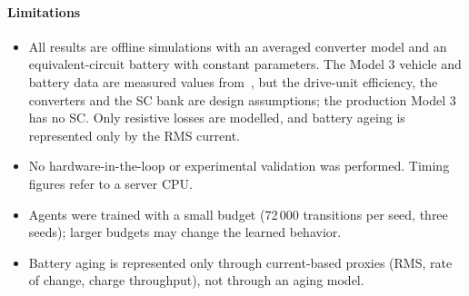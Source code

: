\paragraph{Limitations}
\begin{itemize}
\item All results are offline simulations with an averaged converter model and an equivalent-circuit battery with constant parameters. The Model 3 vehicle and battery data are measured values from~\cite{rosenberger2024m3}, but the drive-unit efficiency, the converters and the SC bank are design assumptions; the production Model 3 has no SC. Only resistive losses are modelled, and battery ageing is represented only by the RMS current.
\item No hardware-in-the-loop or experimental validation was performed. Timing figures refer to a server CPU.
\item Agents were trained with a small budget (72\,000 transitions per seed, three seeds); larger budgets may change the learned behavior.
\item Battery aging is represented only through current-based proxies (RMS, rate of change, charge throughput), not through an aging model.
\end{itemize}
